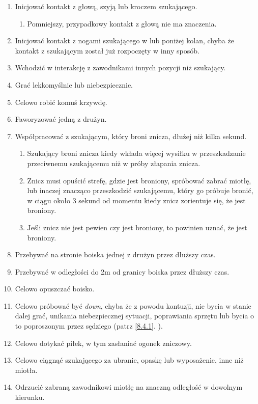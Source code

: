 \documentclass[11pt,a4paper]{article}
\newcommand{\myref}[1]{\ref{#1}. \nameref{#1}}
\begin{document}
\begin{enumerate}

\item
  Inicjować kontakt z głową, szyją lub kroczem szukającego.

  \begin{enumerate}
  
  \item
    Pomniejszy, przypadkowy kontakt z głową nie ma znaczenia.
  \end{enumerate}
\item
  Inicjować kontakt z nogami szukającego w lub poniżej kolan, chyba że
  kontakt z szukającym został już rozpoczęty w inny sposób.
\item
  Wchodzić w interakcję z zawodnikami innych pozycji niż szukający.
\item
  Grać lekkomyślnie lub niebezpiecznie.
\item
  Celowo robić komuś krzywdę.
\item
  Faworyzować jedną z drużyn.
\item
  Współpracować z szukającym, który broni znicza, dłużej niż kilka
  sekund.

  \begin{enumerate}
  
  \item
    Szukający broni znicza kiedy wkłada więcej wysiłku w przeszkadzanie
    przeciwnemu szukającemu niż w próby złapania znicza.
  \item
    Znicz musi opuścić strefę, gdzie jest broniony, spróbować zabrać
    miotłę, lub inaczej znacząco przeszkodzić szukającemu, który go
    próbuje bronić, w ciągu około 3 sekund od momentu kiedy znicz
    zorientuje się, że jest broniony.
  \item
    Jeśli znicz nie jest pewien czy jest broniony, to powinien uznać, że
    jest broniony.
  \end{enumerate}
\item
  Przebywać na stronie boiska jednej z drużyn przez dłuższy czas.
\item
  Przebywać w odległości do 2m od granicy boiska przez dłuższy czas.
\item
  Celowo opuszczać boisko.
\item
  Celowo próbować być \emph{down}, chyba że z powodu kontuzji, nie bycia
  w stanie dalej grać, unikania niebezpiecznej sytuacji, poprawiania
  sprzętu lub bycia o to poproszonym przez sędziego (patrz
  \myref{8.4.1}).
\item
  Celowo dotykać piłek, w tym zasłaniać ogonek zniczowy.
\item
  Celowo ciągnąć szukającego za ubranie, opaskę lub wyposażenie, inne
  niż miotła.
\item
  Odrzucić zabraną zawodnikowi miotłę na znaczną odległość w dowolnym
  kierunku.


\end{enumerate}
\end{document}
